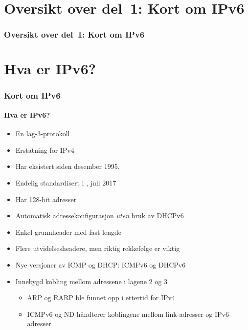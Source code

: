 \begin{frame}
  \partpage
\end{frame}

\section*{Oversikt over del~1: Kort om IPv6}
\begin{frame}
  \frametitle{Oversikt over del~1: Kort om IPv6}
    \tableofcontents
\end{frame}

\section{Hva er IPv6?}
\begin{frame}
  \frametitle{Kort om IPv6}
  \framesubtitle{Hva er IPv6?}
  \begin{itemize}
  \item En lag-3-protokoll
  \item Erstatning for IPv4
  \item Har eksistert siden desember 1995, 
  \item Endelig standardisert i , juli 2017
  \item \alert<2>{Har 128-bit adresser}
  \item \alert<2>{Automatisk adressekonfigurasjon \textit{uten\/} bruk av DHCPv6}
  \item Enkel grunnheader med fast lengde
  \item Flere utvidelsesheadere, men riktig rekkefølge er viktig
  \item Nye versjoner av ICMP og DHCP: ICMPv6 og DHCPv6
  \item Innebygd kobling mellom adressene i lagene 2 og 3
    \begin{itemize}
      \item ARP og RARP ble funnet opp i ettertid for IPv4
      \item ICMPv6 og ND håndterer koblingene mellom link-adresser og IPv6-adresser
    \end{itemize}
  \end{itemize}
\end{frame}


